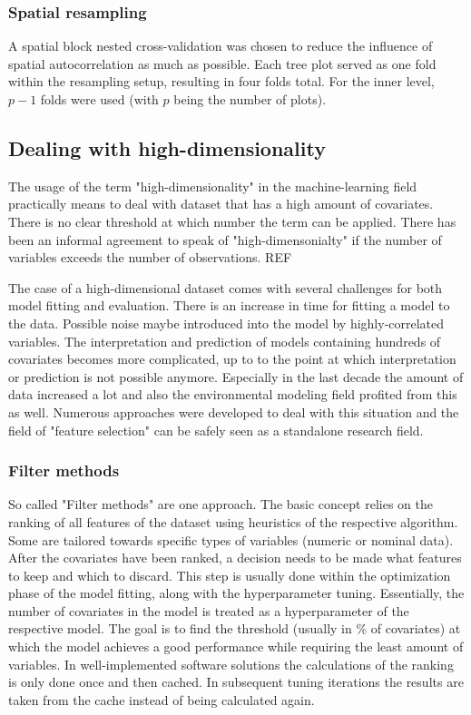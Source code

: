 \documentclass[review]{elsarticle}
\begin{document}
\subsubsection{Spatial resampling}

A spatial block nested cross-validation was chosen to reduce the influence of spatial autocorrelation as much as possible.
Each tree plot served as one fold within the resampling setup, resulting in four folds total.
For the inner level, $p - 1$ folds were used (with $p$ being the number of plots).

\subsection{Dealing with high-dimensionality}
The usage of the term "high-dimensionality" in the machine-learning field practically means to deal with dataset that has a high amount of covariates.
There is no clear threshold at which number the term can be applied.
There has been an informal agreement to speak of "high-dimensonialty" if the number of variables exceeds the number of observations. REF

The case of a high-dimensional dataset comes with several challenges for both model fitting and evaluation.
There is an increase in time for fitting a model to the data.
Possible noise maybe introduced into the model by highly-correlated variables.
The interpretation and prediction of models containing hundreds of covariates becomes more complicated, up to to the point at which interpretation or prediction is not possible anymore.
Especially in the last decade the amount of data increased a lot and also the environmental modeling field profited from this as well.
Numerous approaches were developed to deal with this situation and the field of "feature selection" can be safely seen as a standalone research field.

\subsubsection{Filter methods}

So called "Filter methods" are one approach.
The basic concept relies on the ranking of all features of the dataset using heuristics of the respective algorithm.
Some are tailored towards specific types of variables (numeric or nominal data).
After the covariates have been ranked, a decision needs to be made what features to keep and which to discard.
This step is usually done within the optimization phase of the model fitting, along with the hyperparameter tuning.
Essentially, the number of covariates in the model is treated as a hyperparameter of the respective model.
The goal is to find the threshold (usually in \% of covariates) at which the model achieves a good performance while requiring the least amount of variables.
In well-implemented software solutions the calculations of the ranking is only done once and then cached.
In subsequent tuning iterations the results are taken from the cache instead of being calculated again.
\end{document}
